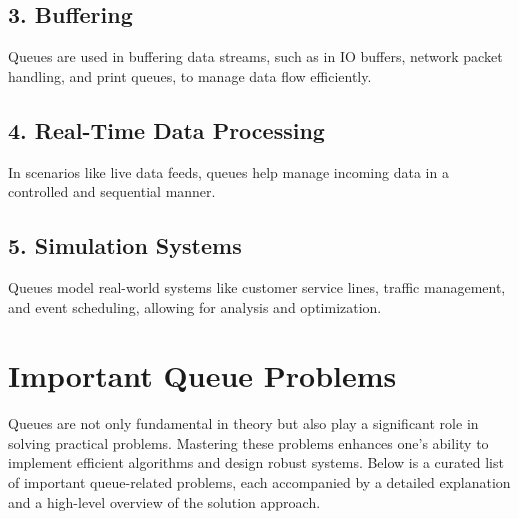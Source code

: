 \subsection*{3. Buffering}
Queues are used in buffering data streams, such as in IO buffers, network packet handling, and print queues, to manage data flow efficiently.

\subsection*{4. Real-Time Data Processing}
In scenarios like live data feeds, queues help manage incoming data in a controlled and sequential manner.

\subsection*{5. Simulation Systems}
Queues model real-world systems like customer service lines, traffic management, and event scheduling, allowing for analysis and optimization.

\section{Important Queue Problems}

Queues are not only fundamental in theory but also play a significant role in solving practical problems. Mastering these problems enhances one's ability to implement efficient algorithms and design robust systems. Below is a curated list of important queue-related problems, each accompanied by a detailed explanation and a high-level overview of the solution approach.

